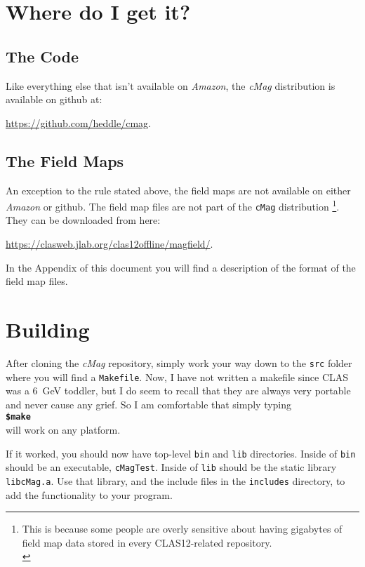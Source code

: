 \documentclass{article}
\begin{document}
\section {Where do I get it?}
\subsection {The Code}
Like everything else that isn't available on \textit{Amazon}, the \textit{cMag} distribution is available on github at:

\url{https://github.com/heddle/cmag}.

\subsection {The Field Maps}
An exception to the rule stated above, the field maps are not available on either \textit{Amazon} or github. The field map files are not part of the \texttt{cMag} distribution \footnote{This is because some people are overly sensitive about having gigabytes of field map data stored in every CLAS12-related repository.\\}. They can be downloaded from here:\

 \url{https://clasweb.jlab.org/clas12offline/magfield/}.

In the Appendix of this document you will find a description of the format of the field map files.


\section {Building}
After cloning the \textit{cMag} repository, simply work your way down to the \texttt{src} folder where you will find a \texttt{Makefile}. Now, I have not written a makefile since CLAS was a 6\ GeV toddler, but I do seem to recall that they are always very portable and never cause any grief. So I am comfortable that simply typing\\

\textbf{\texttt{\$make}}\\

will work on any platform. 

If it worked, you should now have top-level \texttt{bin} and \texttt{lib} directories. Inside of \texttt{bin} should be an executable, \texttt{cMagTest}. Inside of \texttt{lib} should be the static library \texttt {libcMag.a}. Use that library, and the include files in the \texttt{includes} directory, to add the  functionality to your program.
\end{document}
